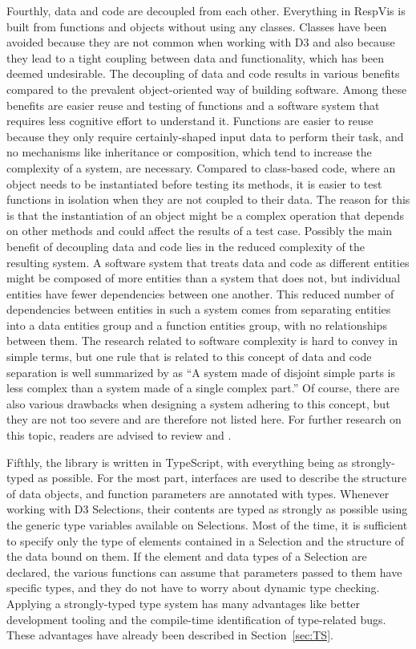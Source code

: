 Fourthly, data and code are decoupled from each other.
Everything in RespVis is built from functions and objects without using any classes. 
Classes have been avoided because they are not common when working with D3 and also because they lead to a tight coupling between data and functionality, which has been deemed undesirable.
The decoupling of data and code results in various benefits compared to the prevalent object-oriented way of building software.
Among these benefits are easier reuse and testing of functions and a software system that requires less cognitive effort to understand it.
Functions are easier to reuse because they only require certainly-shaped input data to perform their task, and no mechanisms like inheritance or composition, which tend to increase the complexity of a system, are necessary.
Compared to class-based code, where an object needs to be instantiated before testing its methods, it is easier to test functions in isolation when they are not coupled to their data. 
The reason for this is that the instantiation of an object might be a complex operation that depends on other methods and could affect the results of a test case. 
Possibly the main benefit of decoupling data and code lies in the reduced complexity of the resulting system.
A software system that treats data and code as different entities might be composed of more entities than a system that does not, but individual entities have fewer dependencies between one another.
This reduced number of dependencies between entities in such a system comes from separating entities into a data entities group and a function entities group, with no relationships between them.
The research related to software complexity is hard to convey in simple terms, but one rule that is related to this concept of data and code separation is well summarized by \textcite{DataCodeSeparation} as \enquote{A system made of disjoint simple parts is less complex than a system made of a single complex part.}
Of course, there are also various drawbacks when designing a system adhering to this concept, but they are not too severe and are therefore not listed here.
For further research on this topic, readers are advised to review \textcite{DataCodeSeparation} and \textcite{OutOfTarPit}.

Fifthly, the library is written in TypeScript, with everything being as strongly-typed as possible.
For the most part, interfaces are used to describe the structure of data objects, and function parameters are annotated with types.
Whenever working with D3 Selections, their contents are typed as strongly as possible using the generic type variables available on Selections.
Most of the time, it is sufficient to specify only the type of elements contained in a Selection and the structure of the data bound on them.
If the element and data types of a Selection are declared, the various functions can assume that parameters passed to them have specific types, and they do not have to worry about dynamic type checking.
Applying a strongly-typed type system has many advantages like better development tooling and the compile-time identification of type-related bugs.
These advantages have already been described in Section~\ref{sec:TS}.

